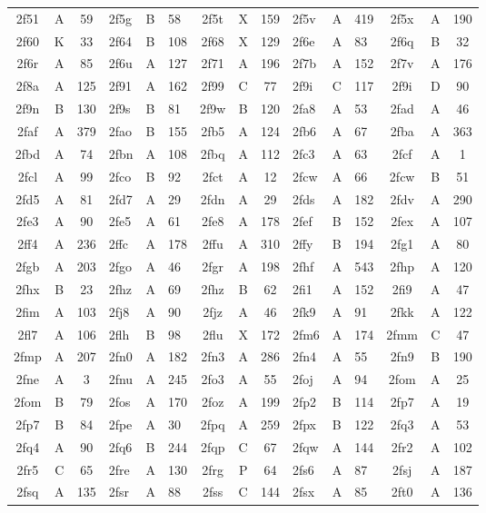 \begin{longtable}{|c|c|c| a|a|a| c|c|c| a|a|a| c|c|c|}
2f51 & A & 59 & 2f5g & B & 58 & 2f5t & X & 159 & 2f5v & A & 419 & 2f5x & A & 190\\
2f60 & K & 33 & 2f64 & B & 108 & 2f68 & X & 129 & 2f6e & A & 83 & 2f6q & B & 32\\
2f6r & A & 85 & 2f6u & A & 127 & 2f71 & A & 196 & 2f7b & A & 152 & 2f7v & A & 176\\
2f8a & A & 125 & 2f91 & A & 162 & 2f99 & C & 77 & 2f9i & C & 117 & 2f9i & D & 90\\
2f9n & B & 130 & 2f9s & B & 81 & 2f9w & B & 120 & 2fa8 & A & 53 & 2fad & A & 46\\
2faf & A & 379 & 2fao & B & 155 & 2fb5 & A & 124 & 2fb6 & A & 67 & 2fba & A & 363\\
2fbd & A & 74 & 2fbn & A & 108 & 2fbq & A & 112 & 2fc3 & A & 63 & 2fcf & A & 1\\
2fcl & A & 99 & 2fco & B & 92 & 2fct & A & 12 & 2fcw & A & 66 & 2fcw & B & 51\\
2fd5 & A & 81 & 2fd7 & A & 29 & 2fdn & A & 29 & 2fds & A & 182 & 2fdv & A & 290\\
2fe3 & A & 90 & 2fe5 & A & 61 & 2fe8 & A & 178 & 2fef & B & 152 & 2fex & A & 107\\
2ff4 & A & 236 & 2ffc & A & 178 & 2ffu & A & 310 & 2ffy & B & 194 & 2fg1 & A & 80\\
2fgb & A & 203 & 2fgo & A & 46 & 2fgr & A & 198 & 2fhf & A & 543 & 2fhp & A & 120\\
2fhx & B & 23 & 2fhz & A & 69 & 2fhz & B & 62 & 2fi1 & A & 152 & 2fi9 & A & 47\\
2fim & A & 103 & 2fj8 & A & 90 & 2fjz & A & 46 & 2fk9 & A & 91 & 2fkk & A & 122\\
2fl7 & A & 106 & 2flh & B & 98 & 2flu & X & 172 & 2fm6 & A & 174 & 2fmm & C & 47\\
2fmp & A & 207 & 2fn0 & A & 182 & 2fn3 & A & 286 & 2fn4 & A & 55 & 2fn9 & B & 190\\
2fne & A & 3 & 2fnu & A & 245 & 2fo3 & A & 55 & 2foj & A & 94 & 2fom & A & 25\\
2fom & B & 79 & 2fos & A & 170 & 2foz & A & 199 & 2fp2 & B & 114 & 2fp7 & A & 19\\
2fp7 & B & 84 & 2fpe & A & 30 & 2fpq & A & 259 & 2fpx & B & 122 & 2fq3 & A & 53\\
2fq4 & A & 90 & 2fq6 & B & 244 & 2fqp & C & 67 & 2fqw & A & 144 & 2fr2 & A & 102\\
2fr5 & C & 65 & 2fre & A & 130 & 2frg & P & 64 & 2fs6 & A & 87 & 2fsj & A & 187\\
2fsq & A & 135 & 2fsr & A & 88 & 2fss & C & 144 & 2fsx & A & 85 & 2ft0 & A & 136\\

\end{longtable}

